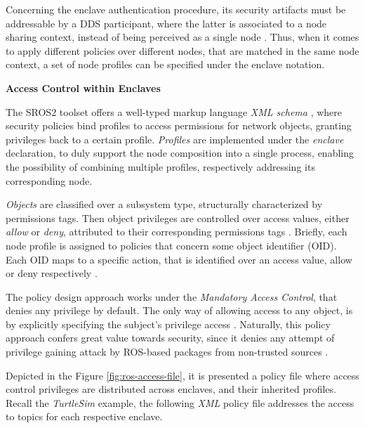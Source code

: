Concerning the enclave authentication procedure, its security artifacts must be addressable by a DDS participant, where the latter is associated to a node sharing context, instead of being perceived as a single node \cite{ros-security-enclaves}. Thus, when it comes to apply different policies over different nodes, that are matched in the same node context, a set of node profiles can be specified under the enclave notation. 
 
\vspace{0.5cm}
\textbf{Access Control within Enclaves}

The SROS2 toolset offers a well-typed markup language \textit{XML schema} \cite{ros-access-control}, where security policies bind profiles to access permissions for network objects, granting privileges back to a certain profile. \textit{Profiles} are implemented under the \textit{enclave} declaration, to duly support the node composition into a single process, enabling the possibility of combining multiple profiles, respectively addressing its corresponding node. %

\textit{Objects} are classified over a subsystem type, structurally characterized by permissions tags. Then object privileges are controlled over access values, either \textit{allow} or \textit{deny}, attributed to their corresponding permissions tags \cite{ros-access-control, white2018procedurally}. Briefly, each node profile is assigned to policies that concern some object identifier (OID). Each OID maps to a specific action, that is identified over an access value, allow or deny respectively \cite{white2016sros}.

The policy design approach works under the \textit{Mandatory Access Control}, that denies any privilege by default. The only way of allowing access to any object, is by explicitly specifying the subject's privilege access \cite{ros-access-control, white2018procedurally, white2016sros}. Naturally, this policy approach confers great value towards security, since it denies any attempt of privilege gaining attack by ROS-based packages from non-trusted sources \cite{white2016sros}.

Depicted in the Figure \ref{fig:ros-access-file}, it is presented a policy file where access control privileges are distributed across enclaves, and their inherited profiles. Recall the \textit{TurtleSim} example, the following \textit{XML} policy file addresses the access to topics for each respective enclave. 

